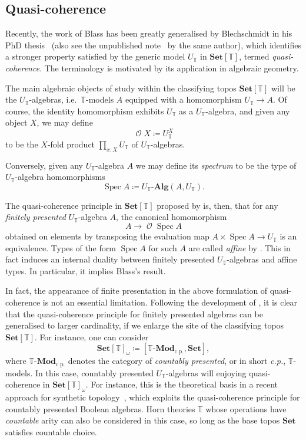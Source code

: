 \documentclass[a4paper,12pt]{amsart}
\theoremstyle{definition}
\newcommand{\mc}[1]{\mathcal{#1}}
\newcommand{\mb}[1]{\mathbf{#1}}
\newcommand{\mbb}[1]{\mathbb{#1}}
\newcommand{\T}{\mbb T}
\newcommand{\mr}[1]{\mathrm{#1}}
\newcommand{\Set}{\mb{Set}}
\newcommand{\alg}{\text{-}\mb{Alg}}
\newcommand{\cp}{_{\mr{c.p.}}}
\newcommand{\mmod}[1]{#1\text{-}\mathbf{Mod}}
\newcommand{\spec}{\operatorname{Spec}}
\newcommand{\opens}{\operatorname{\mc{O}}} %
\begin{document}
\subsection{Quasi-coherence}\label{subsec:qc}

Recently, the work of Blass has been greatly generalised by Blechschmidt in his PhD thesis~\citep{blechschmidt2021using} (also see the unpublished note~\citep{blechschmidt2020general} by the same author), which identifies a stronger property satisfied by the generic model $U_\T$ in $\Set[\T]$, termed \emph{quasi-coherence}. The terminology is motivated by its application in algebraic geometry.

The main algebraic objects of study within the classifying topos $\Set[\T]$ will be the $U_\T$-algebras, i.e.\ $\T$-models $A$ equipped with a homomorphism $U_\T\to A$. Of course, the identity homomorphism exhibits $U_\T$ as a $U_\T$-algebra, and given any object $X$, we may define \[\opens X\coloneq U_\T^X\] to be the $X$-fold product $\prod_{x:X}U_\T$ of $U_\T$-algebras. 

Conversely, given any $U_\T$-algebra $A$ we may define its \emph{spectrum} to be the type of $U_\T$-algebra homomorphisms 
\[ \spec A \coloneq U_\T\alg(A,U_\T).\]

The quasi-coherence principle in $\Set[\T]$ proposed by \citet{blechschmidt2021using} is, then, that for any \emph{finitely presented} $U_\T$-algebra $A$, the canonical homomorphism
\[
  A\to \opens\spec A
\]
obtained on elements by transposing the evaluation map $A\times \spec A\to U_\T$ is an equivalence.
Types of the form $\spec A$ for such $A$ are called \emph{affine} by \citet{blechschmidt2021using}. This in fact induces an internal duality between finitely presented $U_\T$-algebras and affine types. In particular, it implies Blass's result. 

In fact, the appearance of finite presentation in the above formulation of quasi-coherence is not an essential limitation. Following the development of \citet{blechschmidt2021using,blechschmidt2020general}, it is clear that the quasi-coherence principle for finitely presented algebras can be generalised to larger cardinality,
if we enlarge the site of the classifying topos $\Set[\T]$. For instance, one can consider
\[ \Set[\T]_\omega \coloneq [\mmod\T\cp,\Set], \]
where $\mmod\T\cp$ denotes the category of \emph{countably presented}, or in short \emph{c.p.}, $\T$-models. In this case, countably presented $U_\T$-algebras will enjoying quasi-coherence in $\Set[\T]_\omega$. For instance, this is the theoretical basis in a recent approach for synthetic topology~\citep{cherubini2024foundation}, which exploits the quasi-coherence principle for countably presented Boolean algebras. Horn theories $\T$ whose operations have \emph{countable} arity can also be considered in this case, so long as the base topos $\Set$ satisfies countable choice.
\end{document}
